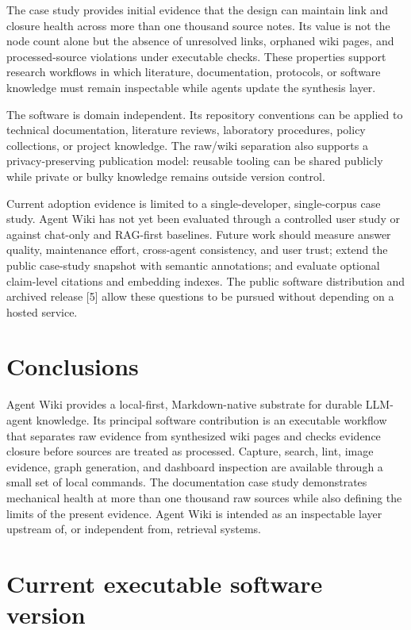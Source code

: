 \documentclass[preprint,12pt,a4paper]{elsarticle}
\begin{document}
The case study provides initial evidence that the design can maintain link and
closure health across more than one thousand source notes. Its value is not the
node count alone but the absence of unresolved links, orphaned wiki pages, and
processed-source violations under executable checks. These properties support
research workflows in which literature, documentation, protocols, or software
knowledge must remain inspectable while agents update the synthesis layer.

The software is domain independent. Its repository conventions can be applied
to technical documentation, literature reviews, laboratory procedures, policy
collections, or project knowledge. The raw/wiki separation also supports a
privacy-preserving publication model: reusable tooling can be shared publicly
while private or bulky knowledge remains outside version control.

Current adoption evidence is limited to a single-developer, single-corpus case
study. Agent Wiki has not yet been evaluated through a controlled user study or
against chat-only and RAG-first baselines. Future work should measure answer
quality, maintenance effort, cross-agent consistency, and user trust; extend the
public case-study snapshot with semantic annotations; and evaluate optional
claim-level citations and embedding indexes. The public software distribution and archived release [5]
allow these questions to be pursued without depending on a hosted service.

\section{Conclusions}

Agent Wiki provides a local-first, Markdown-native substrate for durable LLM-
agent knowledge. Its principal software contribution is an executable workflow
that separates raw evidence from synthesized wiki pages and checks evidence
closure before sources are treated as processed. Capture, search, lint, image
evidence, graph generation, and dashboard inspection are available through a
small set of local commands. The documentation case study demonstrates
mechanical health at more than one thousand raw sources while also defining the
limits of the present evidence. Agent Wiki is intended as an inspectable layer
upstream of, or independent from, retrieval systems.

\section*{Current executable software version}
\end{document}
